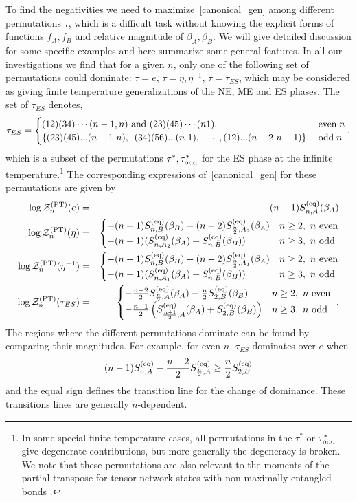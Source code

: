 \documentclass[a4paper,11pt]{article}
\newcommand{\Zpt}{\sZ_n^{(\text{PT})}}
\newcommand{\be}{\begin{equation}}
\newcommand{\ee}{\end{equation}}
\newcommand{\bea}{\begin{eqnarray}}
\newcommand{\eea}{\end{eqnarray}}
\newcommand{\bca}{\begin{cases}}
\newcommand{\eca}{\end{cases}}
\def\b{{\beta}}
\newcommand\ov{\over}
\def\le{\left}
\def\ri{\right}
\newcommand\sZ{{\mathcal Z}}
\begin{document}
To find the negativities we need to maximize~\eqref{canonical_gen} among different permutations $\tau$, which 
is a difficult task without knowing the explicit forms of functions $f_A, f_B$ and relative magnitude of $\b_A, \b_B$. We will give detailed discussion for some specific examples and here summarize some general features. In all our investigations we find that for a given $n$, only one of the following set of permutations could dominate: $\tau =e$, $\tau = \eta, \eta^{-1}$, $\tau = \tau_{ES}$, which may be considered as giving finite temperature generalizations of the NE, ME and ES phases. The set of $\tau_{ES}$ denotes, 
\be 
\tau_{ES} = \bca (12)(34)\cdots (n-1,n) \text{ and } (23)(45)\cdots (n1) ,& \text{even} \; n \cr
 \{(23)(45)...(n-1~n),$~ $(34)(56)...(n~1),~ \cdots~,(12)...(n-2~n-1)\} ,& \text{odd} \; n
 \eca,
\ee 
which is a subset of the permutations $\tau^{\ast}, \tau^{\ast}_{\rm odd}$ for the ES phase at the infinite temperature.\footnote{In some special finite temperature cases, all permutations in the $\tau^{\ast}$ or $\tau^{\ast}_{\rm odd}$ give degenerate contributions, but more generally the degeneracy is broken. We note that these permutations are also relevant to the moments of the partial transpose for tensor network states with non-maximally entangled bonds \cite{2021arXiv210111029D}.} The corresponding expressions of~\eqref{canonical_gen} for these permutations are given by 
\bea\label{er}
\log \sZ_n^{\rm(PT)}(e) &=& - (n-1) S_{n, A}^{\rm (eq)} (\b_A) \\
\label{er1}
\log \Zpt (\eta) &=& \begin{cases}
- (n-1) S_{n, B}^{\rm (eq)} (\b_B) - (n-2) S^{(\rm eq)}_{{n \ov 2}, A_2} (\b_A)
 & n \geq 2,~ n \text{ even} \\
- (n-1) (S_{n, A_2}^{(\rm eq)} (
\b_A) + S_{n, B}^{\rm (eq)} (\b_B)) & n \geq 3,~ n \text{ odd}
\end{cases} 
\\
\label{er2}
\log \Zpt (\eta^{-1}) &=& \begin{cases}
- (n-1) S_{n, B}^{\rm (eq)} (\b_B) - (n-2) S^{(\rm eq)}_{{n \ov 2}, A_1} (\b_A)
 & n \geq 2,~ n \text{ even} \\
- (n-1) (S_{n, A_1}^{(\rm eq)} (
\b_A) + S_{n, B}^{\rm (eq)} (\b_B)) & n \geq 3,~ n \text{ odd}
\end{cases} 
\\
 \log \Zpt (\tau_{ES}) &=& \begin{cases}
 -{n-2 \ov 2} S^{\rm (eq)}_{{n \ov 2}, A}(\beta_A) - {n \ov 2} S_{2, B}^{\rm (eq)}(\beta_B) & n \geq 2,~ n \text{ even} \\
 - {n-1 \ov 2} \le(S^{\rm (eq)}_{{n+1 \ov 2}, A}(\beta_A) + S_{2, B}^{\rm (eq)} (\b_B) \ri)
& n \geq 3,~ n \text{ odd}
\end{cases} \ .
\label{fin_es}
\eea 
The regions where the different permutations dominate can be found by comparing their magnitudes. For example, 
for even $n$, $\tau_{ES}$ dominates over $e$ when 
\be \label{echb} 
(n-1) S_{n, A}^{\rm (eq)} - {n-2 \ov 2} S_{\frac{n}{2}, A}^{\rm (eq)} \geq \frac{n}{2} S^{\rm (eq)}_{2, B}
\ee
and the equal sign defines the transition line for the change of dominance. These transitions lines are 
generally $n$-dependent.
\end{document}

